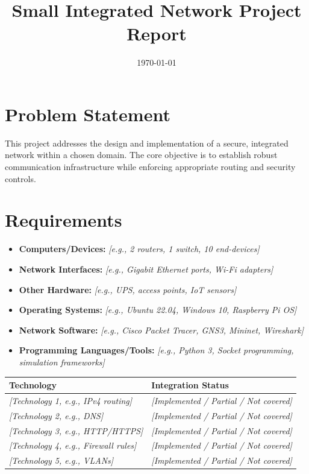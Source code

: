 \documentclass[11pt,a4paper]{article}
\title{Small Integrated Network Project Report}
\author{}
\date{\today}
\begin{document}
\maketitle

\section{Problem Statement}

This project addresses the design and implementation of a secure, integrated network within a chosen domain. The core objective is to establish robust communication infrastructure while enforcing appropriate routing and security controls.

\section{Requirements}
\begin{itemize}
  \item \textbf{Computers/Devices:} \textit{[e.g., 2 routers, 1 switch, 10 end-devices]}
  \item \textbf{Network Interfaces:} \textit{[e.g., Gigabit Ethernet ports, Wi-Fi adapters]}
  \item \textbf{Other Hardware:} \textit{[e.g., UPS, access points, IoT sensors]}
\end{itemize}

\begin{itemize}
  \item \textbf{Operating Systems:} \textit{[e.g., Ubuntu 22.04, Windows 10, Raspberry Pi OS]}
  \item \textbf{Network Software:} \textit{[e.g., Cisco Packet Tracer, GNS3, Mininet, Wireshark]}
  \item \textbf{Programming Languages/Tools:} \textit{[e.g., Python 3, Socket programming, simulation frameworks]}
\end{itemize}

\begin{tabularx}{\linewidth}{X X}
  \toprule
  \textbf{Technology} & \textbf{Integration Status} \\
  \midrule
  \textit{[Technology 1, e.g., IPv4 routing]} & \textit{[Implemented / Partial / Not covered]} \\
  \textit{[Technology 2, e.g., DNS]} & \textit{[Implemented / Partial / Not covered]} \\
  \textit{[Technology 3, e.g., HTTP/HTTPS]} & \textit{[Implemented / Partial / Not covered]} \\
  \textit{[Technology 4, e.g., Firewall rules]} & \textit{[Implemented / Partial / Not covered]} \\
  \textit{[Technology 5, e.g., VLANs]} & \textit{[Implemented / Partial / Not covered]} \\
  \bottomrule
\end{tabularx}
\end{document}
